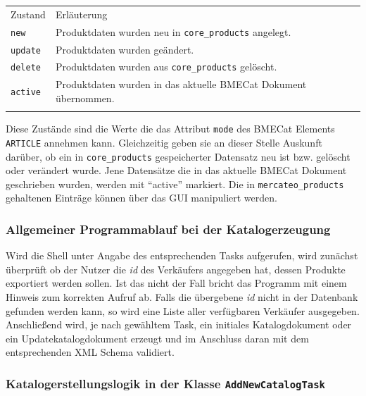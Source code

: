 \begin{table}[!htbp]
	\begin{tabularx}{\textwidth}{p{3cm} X}
	\rowcolor[HTML]{EFEFEF} 
	Zustand & Erläuterung \\ \cline{1-2} \addlinespace[7pt]
	\texttt{new} & Produktdaten wurden neu in \texttt{core\_products} angelegt. \\
	\texttt{update} & Produktdaten wurden geändert. \\
	\texttt{delete} & Produktdaten wurden aus \texttt{core\_products} gelöscht. \\
	\texttt{active} & Produktdaten wurden in das aktuelle BMECat Dokument übernommen. \\
	   \addlinespace[7pt] \cline{1-2} 
	\end{tabularx}%
		\end{table}	
	Diese Zustände sind die Werte die das Attribut \texttt{mode} des BMECat Elements \texttt{ARTICLE} annehmen kann. Gleichzeitig geben sie an dieser Stelle Auskunft darüber, ob ein in \texttt{core\_products} gespeicherter Datensatz neu ist bzw. gelöscht oder verändert wurde. Jene Datensätze die in das aktuelle BMECat Dokument geschrieben wurden, werden mit \enquote{active} markiert. Die in \texttt{mercateo\_products} gehaltenen Einträge können über das GUI manipuliert werden.
	
	\subsubsection{Allgemeiner Programmablauf bei der Katalogerzeugung}
	
	Wird die Shell unter Angabe des entsprechenden Tasks aufgerufen, wird zunächst überprüft ob der Nutzer die \textit{id} des Verkäufers angegeben hat, dessen Produkte exportiert werden sollen. Ist das nicht der Fall bricht das Programm mit einem Hinweis zum korrekten Aufruf ab. Falls die übergebene \textit{id} nicht in der Datenbank gefunden werden kann, so wird eine Liste aller verfügbaren Verkäufer ausgegeben. Anschließend wird, je nach gewähltem Task, ein initiales Katalogdokument oder ein Updatekatalogdokument erzeugt und im Anschluss daran mit dem entsprechenden XML Schema validiert. 
	
	\subsubsection{Katalogerstellungslogik in der Klasse \texttt{AddNewCatalogTask}}
	
